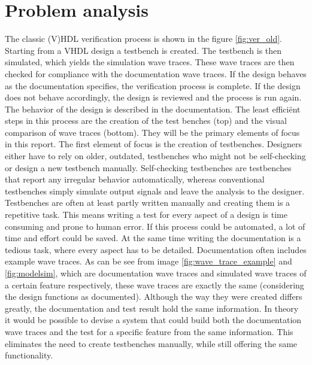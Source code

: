 
\chapter{Problem analysis}\label{PA}%
The classic (V)HDL verification process is shown in the figure \ref{fig:ver_old}. Starting from a VHDL design a testbench is created. The testbench is then simulated, which yields the simulation wave traces. These wave traces are then checked for compliance with the documentation wave traces. If the design behaves as the documentation specifies, the verification process is complete. If the design does not behave accordingly, the design is reviewed and the process is run again. The behavior of the design is described in the documentation.
\npar
The least efficiënt steps in this process are the creation of the test benches (top) and the visual comparison of wave traces (bottom). They will be the primary elements of focus in this report.
\npar
The first element of focus is the creation of testbenches. Designers either have to rely on older, outdated, testbenches who might not be self-checking or design a new testbench manually. Self-checking testbenches are testbenches that report any irregular behavior automatically, whereas conventional testbenches simply simulate output signals and leave the analysis to the designer. Testbenches are often at least partly written manually and creating them is a repetitive task. This means writing a test for every aspect of a design is time consuming and prone to human error. If this process could be automated, a lot of time and effort could be saved. At the same time writing the documentation is a tedious task, where every aspect has to be detailed. Documentation often includes example wave traces. As can be see from image \ref{fig:wave_trace_example} and \ref{fig:modelsim}, which are documentation wave traces and simulated wave traces of a certain feature respectively, these wave traces are exactly the same (considering the design functions as documented). Although the way they were created differs greatly, the documentation and test result hold the same information. In theory it would be possible to devise a system that could build both the documentation wave traces and the test for a specific feature from the same information. This eliminates the need to create testbenches manually, while still offering the same functionality.%
